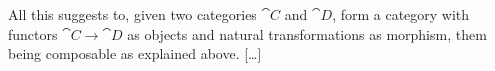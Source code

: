 All this suggests to, given two categories \(\cat C\) and \(\cat D\),
form a category with functors \(\cat C \to \cat D\) as objects and
natural transformations as morphism, them being composable as
explained above. [\dots{}]




